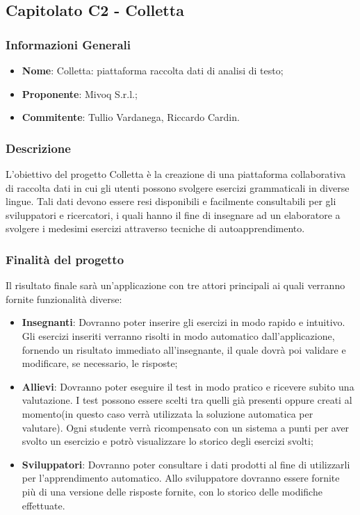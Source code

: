 \subsection{Capitolato C2 - Colletta} 
\subsubsection{Informazioni Generali}
\begin{itemize}
	\item \textbf{Nome}: Colletta: piattaforma raccolta dati di analisi di testo;
	\item \textbf{Proponente}: Mivoq S.r.l.;
	\item \textbf{Commitente}: Tullio Vardanega, Riccardo Cardin.
\end{itemize}
\subsubsection{Descrizione}
L'obiettivo del progetto Colletta è la creazione di una piattaforma collaborativa di raccolta dati in cui gli utenti possono svolgere esercizi grammaticali in diverse lingue. Tali dati devono essere resi disponibili e facilmente consultabili per gli sviluppatori e ricercatori, i quali hanno il fine di insegnare ad un elaboratore a svolgere i medesimi esercizi attraverso tecniche di autoapprendimento.
\subsubsection{Finalità del progetto}
Il risultato finale sarà un'applicazione con tre attori principali ai quali verranno fornite funzionalità diverse:
\begin{itemize}
	\item \textbf{Insegnanti}: Dovranno poter inserire gli esercizi in modo rapido e intuitivo. Gli esercizi inseriti verranno risolti in modo automatico dall'applicazione, fornendo un risultato immediato all'insegnante, il quale dovrà poi validare e modificare, se necessario, le risposte;
	\item \textbf{Allievi}: Dovranno poter eseguire il test in modo pratico e ricevere subito una valutazione. I test possono essere scelti tra quelli già presenti oppure creati al momento(in questo caso verrà utilizzata la soluzione automatica per valutare). Ogni studente verrà ricompensato con un sistema a punti per aver svolto un esercizio e potrò visualizzare lo storico degli esercizi svolti;
	\item \textbf{Sviluppatori}: Dovranno poter consultare i dati prodotti al fine di utilizzarli per l'apprendimento automatico. Allo sviluppatore dovranno essere fornite più di una versione delle risposte fornite, con lo storico delle modifiche effettuate.
\end{itemize}

